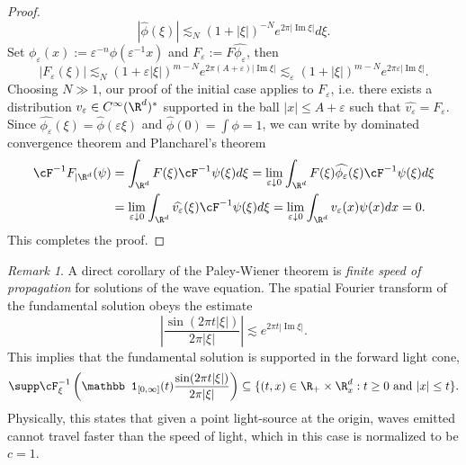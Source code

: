 \documentclass[reqno]{amsart}
\theoremstyle{definition}
\theoremstyle{remark}
\newtheorem*{remark}{Remark}
\renewcommand{\epsilon}{\varepsilon}
\renewcommand{\Im}{\operatorname{Im}}
\begin{document}
\begin{proof}
		\[ |\widehat \phi(\xi)| \lesssim_N (1 + |\xi|)^{-N} e^{2\pi |\Im \xi|} d \xi. \] 
	Set $\phi_\epsilon (x) := \epsilon^{-n} \phi(\epsilon^{-1} x)$ and $F_\epsilon := F \widehat{\phi_\epsilon}$, then 
		\[ |F_\epsilon (\xi)| \lesssim_N (1 + \epsilon |\xi|)^{m - N} e^{2\pi (A + \epsilon) |\Im \xi|} \lesssim_\epsilon (1 + |\xi|)^{m - N} e^{2\pi \epsilon |\Im \xi|}. \]		
	Choosing $N \gg 1$, our proof of the initial case applies to $F_\epsilon$, i.e. there exists a distribution $v_\epsilon \in C^\infty (\R^d)^*$ supported in the ball $|x| \leq A + \epsilon$ such that $\widehat{v_\epsilon} = F_\epsilon$. Since $\widehat{\phi_\epsilon} (\xi) = \widehat{\phi} (\epsilon \xi)$ and $\widehat \phi(0) = \int \phi = 1$, we can write by dominated convergence theorem and Plancharel's theorem 
	\begin{align*}
		\cF^{-1} F_{|\R^d} (\psi) 
			&= \int_{\R^d} F(\xi) \cF^{-1} \psi (\xi) d \xi = \lim_{\epsilon \downarrow 0} \int_{\R^d} F(\xi) \widehat{\phi_\epsilon} (\xi) \cF^{-1} \psi (\xi) d \xi \\
			&= \lim_{\epsilon \downarrow 0} \int_{\R^d} \widehat{v_\epsilon} (\xi) \cF^{-1} \psi (\xi) d \xi = \lim_{\epsilon\downarrow 0} \int_{\R^d} v_\epsilon (x) \psi (x) d x = 0.
	\end{align*}
	This completes the proof. 	
\end{proof}

\begin{remark}
A direct corollary of the Paley-Wiener theorem is \textit{finite speed of propagation} for solutions of the wave equation. The spatial Fourier transform of the fundamental solution obeys the estimate
	\[ \left|\frac{\sin (2\pi t |\xi|)}{2\pi |\xi|}\right| \lesssim  e^{2\pi t |\Im \xi|}. \]
This implies that the fundamental solution is supported in the forward light cone, 
	\[ \supp \cF_\xi^{-1} \left( \mathbb 1_{[0, \infty]} (t) \frac{\sin (2\pi t |\xi|)}{2\pi |\xi|} \right) \subseteq \{ (t, x) \in \R_+ \times \R^d_x : t \geq 0 \text{ and } |x| \leq t \}. \]
Physically, this states that given a point light-source at the origin, waves emitted cannot travel faster than the speed of light, which in this case is normalized to be $c = 1$. 
\end{remark}
\end{document}
